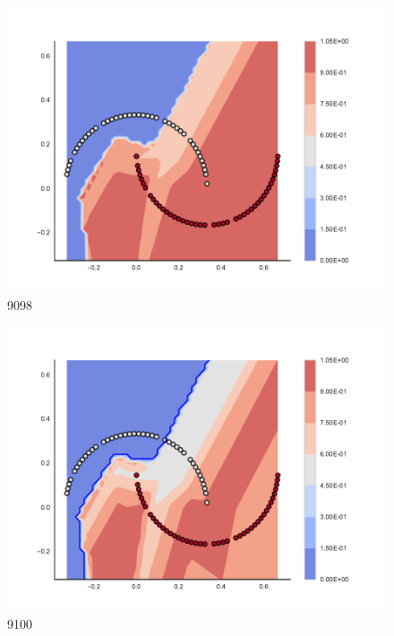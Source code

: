 \begin{subfigure}[b]{0.09\textwidth}
    \includegraphics[clip, trim=2.35cm 1.75cm 4.5cm 0cm,width=\textwidth]{img/convergence/9098.pdf}
    \caption{9098}
    \label{fig:convergence_9098}
\end{subfigure}
%
\begin{subfigure}[b]{0.09\textwidth}
    \includegraphics[clip, trim=2.35cm 1.75cm 4.5cm 0cm,width=\textwidth]{img/convergence/9100.pdf}
    \caption{9100}
    \label{fig:convergence_9100}
\end{subfigure}
%
